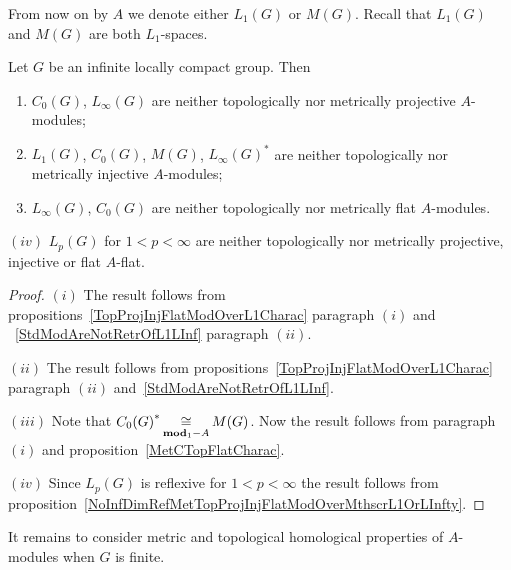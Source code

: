 From now on by $A$ we denote either $L_1(G)$ or $M(G)$. Recall that $L_1(G)$ and
$M(G)$ are both $L_1$-spaces.

\begin{proposition}\label{StdModAreNotL1MGMetTopProjInjFlat} Let $G$ be an
infinite locally compact group. Then

\begin{enumerate}[label = (\roman*)]
    \item $C_0(G)$, $L_\infty(G)$ are neither topologically nor metrically 
    projective $A$-modules;

    \item $L_1(G)$, $C_0(G)$, $M(G)$, ${L_\infty(G)}^*$ are neither 
    topologically nor metrically injective $A$-modules;

    \item $L_\infty(G)$, $C_0(G)$ are neither topologically nor metrically flat
    $A$-modules.
\end{enumerate}
\end{proposition}

$(iv)$ $L_p(G)$ for $1<p<\infty$ are neither topologically nor metrically
projective, injective or flat $A$-flat.

\begin{proof} $(i)$ The result follows from
propositions~\ref{TopProjInjFlatModOverL1Charac} paragraph $(i)$ and
~\ref{StdModAreNotRetrOfL1LInf} paragraph $(ii)$.

$(ii)$ The result follows from propositions~\ref{TopProjInjFlatModOverL1Charac}
paragraph $(ii)$ and~\ref{StdModAreNotRetrOfL1LInf}.

$(iii)$ Note that ${C_0(G)}^*\mathop{\mathbin{\cong}}\limits_{\mathbf{mod}_1-A}M(G)$. Now the result 
follows from paragraph $(i)$ and proposition~\ref{MetCTopFlatCharac}.

$(iv)$ Since $L_p(G)$ is reflexive for $1<p<\infty$ the result follows
from proposition~\ref{NoInfDimRefMetTopProjInjFlatModOverMthscrL1OrLInfty}.
\end{proof}

It remains to consider metric and topological homological properties of
$A$-modules when $G$ is finite.


